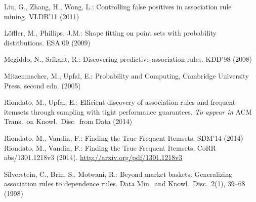 \begin{thebibliography}{33}
Liu, G., Zhang, H., Wong, L.: Controlling false positives in association rule
  mining.
\newblock VLDB'11 (2011)

L\"{o}ffler, M., Phillips, J.M.: Shape fitting on point sets with probability
  distributions.
\newblock ESA'09 (2009)

Megiddo, N., Srikant, R.: Discovering predictive association rules.
\newblock KDD'98 (2008)

  Mitzenmacher, M., Upfal, E.: Probability and Computing,  
  \newblock Cambridge University Press, second edn. (2005)

Riondato, M., Upfal, E.: Efficient discovery of association rules and frequent
  itemsets through sampling with tight performance guarantees.
\newblock \emph{To appear in} ACM Trans.~on Knowl.~Disc.~from Data  (2014)

\ifarxiv
{}
Riondato, M., Vandin, F.: Finding the True Frequent Itemsets.
\newblock SDM'14 (2014)
\else
{}
Riondato, M., Vandin, F.: Finding the True Frequent Itemsets.
\newblock CoRR abs/1301.1218v3 (2014).
\urlprefix\url{http://arxiv.org/pdf/1301.1218v3}
\fi

Silverstein, C., Brin, S., Motwani, R.: Beyond market baskets: Generalizing
  association rules to dependence rules.
\newblock Data Min.~and Knowl.~Disc.~2(1), 39--68 (1998)%


\end{thebibliography}
